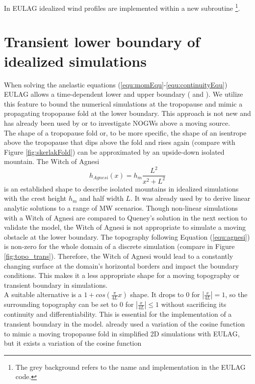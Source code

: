 In EULAG idealized wind profiles are implemented within a new subroutine \footnote[2]{The grey background refers to the name and implementation in the EULAG code.}. 

\section{Transient lower boundary of idealized simulations}
\label{sec:trans-boundary}
When solving the anelastic equations (\ref{equ:momEqu}-\ref{equ:continuityEqu}) EULAG allows a time-dependent lower and upper boundary (\cite[]{prusa_propagation_1996} and \cite[]{wedi_extending_2003}). We utilize this feature to bound the numerical simulations at the tropopause and mimic a propagating tropopause fold at the lower boundary. This approach is not new and has already been used by \textcite[]{pfister_gravity_1993} or \textcite[]{prusa_all-scale_2003} to investigate NOGWs above a moving source. \\
The shape of a tropopause fold or, to be more specific, the shape of an isentrope above the tropopause that dips above the fold and rises again (compare with Figure \ref{fig:skerlakFold}) can be approximated by an upside-down isolated mountain.
The Witch of Agnesi
\begin{equation}
    h_{Agnesi}(x) = h_m \frac{L^2}{x^2+L^2}
    \label{equ:agnesi}
\end{equation}
is an established shape to describe isolated mountains in idealized simulations with the crest height $h_m$ and half width $L$. It was already used by \textcite{queney_problem_1948} to derive linear analytic solutions to a range of MW scenarios. Though non-linear simulations with a Witch of Agnesi are compared to Queney's solution in the next section to validate the model, the Witch of Agnesi is not appropriate to simulate a moving obstacle at the lower boundary. The topography following Equation (\ref{equ:agnesi}) is non-zero for the whole domain of a discrete simulation (compare in Figure \ref{fig:topo_trans}). Therefore, the Witch of Agnesi would lead to a constantly changing surface at the domain's horizontal borders and impact the boundary conditions. This makes it a less appropriate shape for a moving topography or transient boundary in simulations. \\
A suitable alternative is a $1+cos(\frac{\pi}{4L}x)$ shape. It drops to 0 for $|\frac{x}{4L}| = 1$, so the surrounding topography can be set to 0 for $|\frac{x}{4L}| \leq 1$ without sacrificing its continuity and differentiability. This is essential for the implementation of a transient boundary in the model. \textcite[]{prusa_all-scale_2003} already used a variation of the cosine function to mimic a moving tropopause fold in simplified 2D simulations with EULAG, but it exists a variation of the cosine function 
